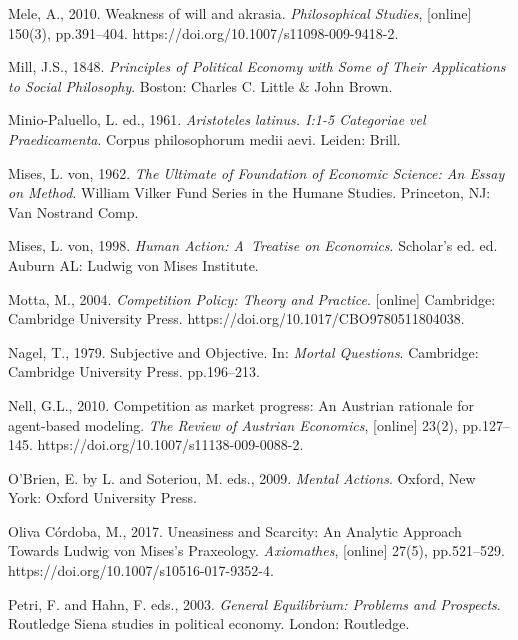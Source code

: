 Mele, A., 2010. Weakness of will and akrasia. \textit{Philosophical Studies}, [online] 150(3), pp.391–404. https://doi.org/10.1007/s11098-009-9418-2.



Mill, J.S., 1848. \textit{Principles of Political Economy with Some of Their Applications to Social Philosophy}. Boston: Charles C. Little \& John Brown.



Minio-Paluello, L. ed., 1961. \textit{Aristoteles latinus. I:1-5 Categoriae vel Praedicamenta}. Corpus philosophorum medii aevi. Leiden: Brill.



Mises, L. von, 1962. \textit{The Ultimate of Foundation of Economic Science: An Essay on Method}. William Vilker Fund Series in the Humane Studies. Princeton, NJ: Van Nostrand Comp.



Mises, L. von, 1998. \textit{Human Action: A~Treatise on Economics}. Scholar's ed. ed. Auburn AL: Ludwig von Mises Institute.



Motta, M., 2004. \textit{Competition Policy: Theory and Practice}. [online] Cambridge: Cambridge University Press. https://doi.org/10.1017/CBO9780511804038.



Nagel, T., 1979. Subjective and Objective. In: \textit{Mortal Questions}. Cambridge: Cambridge University Press. pp.196–213.



Nell, G.L., 2010. Competition as market progress: An Austrian rationale for agent-based modeling. \textit{The Review of Austrian Economics}, [online] 23(2), pp.127–145. https://doi.org/10.1007/s11138-009-0088-2.



O'Brien, E. by L. and Soteriou, M. eds., 2009. \textit{Mental Actions}. Oxford, New York: Oxford University Press.



Oliva Córdoba, M., 2017. Uneasiness and Scarcity: An Analytic Approach Towards Ludwig von Mises's Praxeology. \textit{Axiomathes}, [online] 27(5), pp.521–529. https://doi.org/10.1007/s10516-017-9352-4.



Petri, F. and Hahn, F. eds., 2003. \textit{General Equilibrium: Problems and Prospects}. Routledge Siena studies in political economy. London: Routledge.



